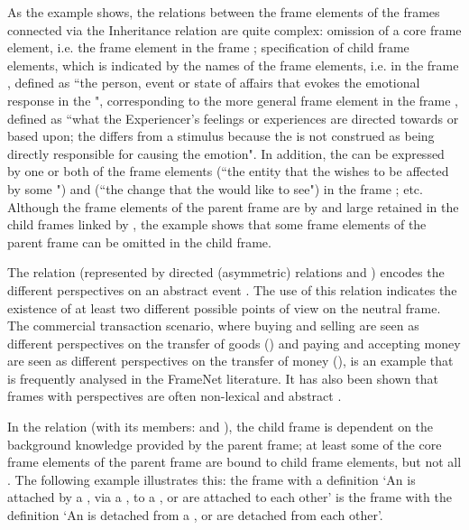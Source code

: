 \documentclass[output=paper,colorlinks,citecolor=brown]{langscibook}
\begin{document}
As the example shows, the relations between the frame elements of the frames connected via the Inheritance relation are quite complex: omission of a core frame element, i.e. the frame element  in the frame ; specification of child frame elements, which is indicated by the names of the frame elements, i.e.  in the frame , defined as ``the person, event or state of affairs that evokes the emotional response in the ", corresponding to the more general frame element  in the frame , defined as ``what the Experiencer's feelings or experiences are directed towards or based upon; the  differs from a stimulus because the  is not construed as being directly responsible for causing the emotion". In addition, the  can be expressed by one or both of the frame elements  (``the entity that the  wishes to be affected by some ") and  (``the change that the  would like to see") in the frame ; etc. Although the frame elements of the parent frame are by and large retained in the child frames linked by , the example shows that some frame elements of the parent frame can be omitted in the child frame.

 
The relation  (represented by directed (asymmetric) relations  and ) encodes the different perspectives on an abstract event \citep[867]{fillmore2010}. The use of this relation indicates the existence of at least two different possible points of view on the neutral frame. The commercial transaction scenario, where buying and selling are seen as different perspectives on the transfer of goods () and paying and accepting money are seen as different perspectives on the transfer of money (), is an example that is frequently analysed in the FrameNet literature. 
It has also been shown that frames with perspectives are often non-lexical and abstract \citep[131]{osswald2014jr}.

In the relation  (with its members:  and ), the child frame is dependent on the background knowledge provided by the parent frame; at least some of the core frame elements of the parent frame are bound to child frame elements, but not all \citep[330]{fillmore2010}. The following example illustrates this: the frame  with a definition `An  is attached by a , via a , to a , or  are attached to each other' is  the frame  with the definition `An   is detached from a , or  are detached from each other'.
\end{document}

